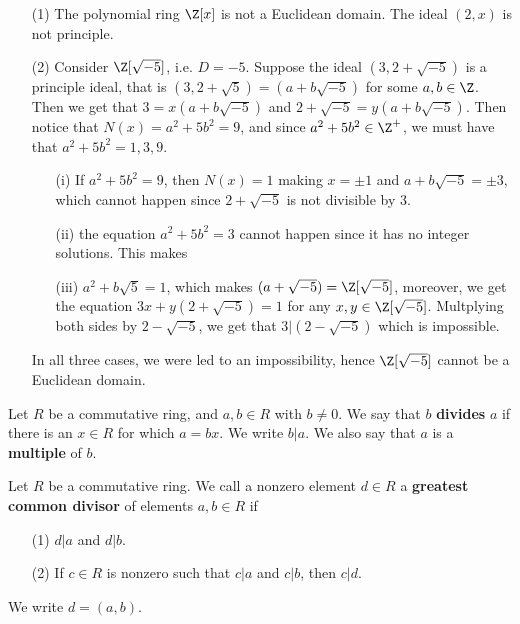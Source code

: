 \begin{example}\label{2.2}
    \begin{enumerate}
        \item[(1)] The polynomial ring $\Z[x]$ is not a Euclidean domain. The
            ideal $(2,x)$ is not principle.

        \item[(2)] Consider $\Z[\sqrt{-5}]$, i.e. $D=-5$. Suppose the ideal
            $(3,2+\sqrt{-5})$ is a principle ideal, that is
            $(3,2+\sqrt{5})=(a+b\sqrt{-5})$ for some $a,b \in \Z$. Then we get
            that $3=x(a+b\sqrt{-5})$ and $2+\sqrt{-5}=y(a+b\sqrt{-5})$. Then
            notice that $N(x)=a^2+5b^2=9$, and since  $a^2+5b^2 \in \Z^+$, we
            must have that $a^2+5b^2=1,3,9$.
            \begin{enumerate}
            \item[(i)] If $a^2+5b^2=9$, then $N(x)=1$ making $x=\pm 1$ and
                $a+b\sqrt{-5}=\pm3$, which cannot happen since $2+\sqrt{-5}$ is
                not divisible by $3$.

            \item[(ii)] the equation $a^2+5b^2=3$ cannot happen since it has no
                integer solutions. This makes

            \item[(iii)] $a^2+b\sqrt{5}=1$, which makes
                $(a+\sqrt{-5})=\Z[\sqrt{-5}]$, moreover, we get the equation
                $3x+y(2+\sqrt{-5})=1$ for any $x,y \in \Z[\sqrt{-5}]$.
                Multplying both sides by $2-\sqrt{-5}$, we get that
                $3|(2-\sqrt{-5})$ which is impossible.
            \end{enumerate}
            In all three cases, we were led to an impossibility, hence
            $\Z[\sqrt{-5}]$ cannot be a Euclidean domain.
    \end{enumerate}
\end{example}

\begin{definition}
    Let $R$ be a commutative ring, and  $a,b \in R$ with  $b \neq 0$. We say
    that $b$ \textbf{divides} $a$ if there is an  $x \in R$ for which  $a=bx$.
    We write  $b|a$. We also say that $a$ is a \textbf{multiple} of $b$.
\end{definition}

\begin{definition}
    Let $R$ be a commutative ring. We call a nonzero element  $d \in R$ a
    \textbf{greatest common divisor} of elements $a,b \in R$ if
    \begin{enumerate}
        \item[(1)] $d|a$ and  $d|b$.

        \item[(2)] If $c \in R$ is nonzero such that  $c|a$ and  $c|b$, then
            $c|d$.
    \end{enumerate}
    We write $d=(a,b)$.
\end{definition}

